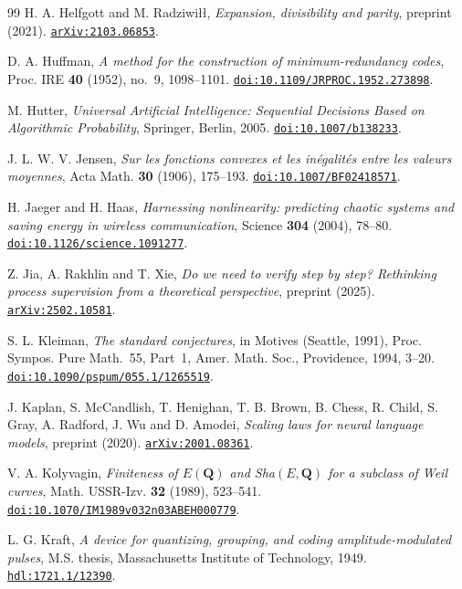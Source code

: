 \begin{thebibliography}{99}
H. A. Helfgott and M. Radziwi\l\l,
\emph{Expansion, divisibility and parity},
preprint (2021).
\href{https://arxiv.org/abs/2103.06853}{\nolinkurl{arXiv:2103.06853}}.

D. A. Huffman,
\emph{A method for the construction of minimum-redundancy codes},
Proc. IRE \textbf{40} (1952), no.~9, 1098--1101.
\href{https://doi.org/10.1109/JRPROC.1952.273898}{\nolinkurl{doi:10.1109/JRPROC.1952.273898}}.

M. Hutter,
\emph{Universal Artificial Intelligence: Sequential Decisions Based on Algorithmic Probability},
Springer, Berlin, 2005.
\href{https://doi.org/10.1007/b138233}{\nolinkurl{doi:10.1007/b138233}}.

J. L. W. V. Jensen,
\emph{Sur les fonctions convexes et les in\'egalit\'es entre les valeurs moyennes},
Acta Math. \textbf{30} (1906), 175--193.
\href{https://doi.org/10.1007/BF02418571}{\nolinkurl{doi:10.1007/BF02418571}}.

H. Jaeger and H. Haas,
\emph{Harnessing nonlinearity: predicting chaotic systems and saving energy in wireless communication},
Science \textbf{304} (2004), 78--80.
\href{https://doi.org/10.1126/science.1091277}{\nolinkurl{doi:10.1126/science.1091277}}.

Z. Jia, A. Rakhlin and T. Xie,
\emph{Do we need to verify step by step? Rethinking process supervision from a theoretical perspective},
preprint (2025).
\href{https://arxiv.org/abs/2502.10581}{\nolinkurl{arXiv:2502.10581}}.

S. L. Kleiman,
\emph{The standard conjectures},
in Motives (Seattle, 1991), Proc. Sympos. Pure Math.~55, Part~1, Amer. Math. Soc., Providence, 1994, 3--20.
\href{https://doi.org/10.1090/pspum/055.1/1265519}{\nolinkurl{doi:10.1090/pspum/055.1/1265519}}.

J. Kaplan, S. McCandlish, T. Henighan, T. B. Brown, B. Chess, R. Child, S. Gray, A. Radford, J. Wu and D. Amodei,
\emph{Scaling laws for neural language models},
preprint (2020).
\href{https://arxiv.org/abs/2001.08361}{\nolinkurl{arXiv:2001.08361}}.

V. A. Kolyvagin,
\emph{Finiteness of $E(\mathbf{Q})$ and Sha$(E,\mathbf{Q})$ for a subclass of Weil curves},
Math. USSR-Izv. \textbf{32} (1989), 523--541.
\href{https://doi.org/10.1070/IM1989v032n03ABEH000779}{\nolinkurl{doi:10.1070/IM1989v032n03ABEH000779}}.

L. G. Kraft,
\emph{A device for quantizing, grouping, and coding amplitude-modulated pulses},
M.S. thesis, Massachusetts Institute of Technology, 1949.
\href{https://hdl.handle.net/1721.1/12390}{\nolinkurl{hdl:1721.1/12390}}.


\end{thebibliography}

